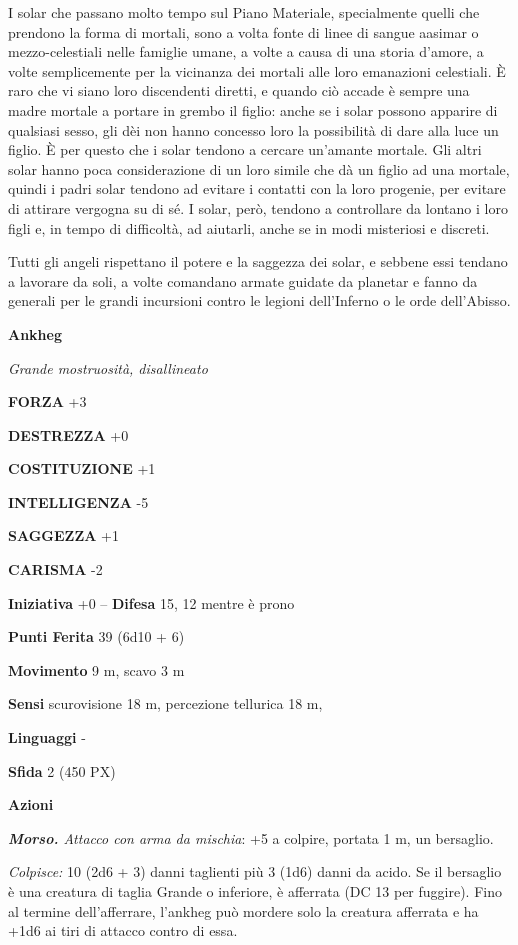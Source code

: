 \begin{multicols}{2}
	I solar che passano molto tempo sul Piano Materiale, specialmente quelli che prendono la forma di mortali, sono a volta fonte di linee di sangue aasimar o mezzo-celestiali nelle famiglie umane, a volte a causa di una storia d'amore, a volte semplicemente per la vicinanza dei mortali alle loro emanazioni celestiali. È raro che vi siano loro discendenti diretti, e quando ciò accade è sempre una madre mortale a portare in grembo il figlio: anche se i solar possono apparire di qualsiasi sesso, gli dèi non hanno concesso loro la possibilità di dare alla luce un figlio. È per questo che i solar tendono a cercare un'amante mortale. Gli altri solar hanno poca considerazione di un loro simile che dà un figlio ad una mortale, quindi i padri solar tendono ad evitare i contatti con la loro progenie, per evitare di attirare vergogna su di sé. I solar, però, tendono a controllare da lontano i loro figli e, in tempo di difficoltà, ad aiutarli, anche se in modi misteriosi e discreti.

	Tutti gli angeli rispettano il potere e la saggezza dei solar, e sebbene essi tendano a lavorare da soli, a volte comandano armate guidate da planetar e fanno da generali per le grandi incursioni contro le legioni dell'Inferno o le orde dell'Abisso.

	\medskip{}\textbf{Ankheg}

	\textit{Grande mostruosità, disallineato}

	\textbf{FORZA} +3

	\textbf{DESTREZZA} +0

	\textbf{COSTITUZIONE} +1

	\textbf{INTELLIGENZA} -5

	\textbf{SAGGEZZA} +1

	\textbf{CARISMA} -2

	\textbf{Iniziativa} +0 -- \textbf{Difesa} 15, 12 mentre è prono

	\textbf{Punti Ferita} 39 (6d10 + 6)

	\textbf{Movimento} 9 m, scavo 3 m

	\textbf{Sensi} scurovisione 18 m, percezione tellurica 18 m,

	\textbf{Linguaggi} -

	\textbf{Sfida} 2 (450 PX)

	\textbf{Azioni}

	\textit{\textbf{Morso.} Attacco con arma da mischia}: +5 a colpire, portata 1 m, un bersaglio.

	\textit{Colpisce:} 10 (2d6 + 3) danni taglienti più 3 (1d6) danni da acido. Se il bersaglio è una creatura di taglia Grande o inferiore, è afferrata (DC 13 per fuggire). Fino al termine dell'afferrare, l'ankheg può mordere solo la creatura afferrata e ha +1d6 ai tiri di attacco contro di essa.


\end{multicols}
